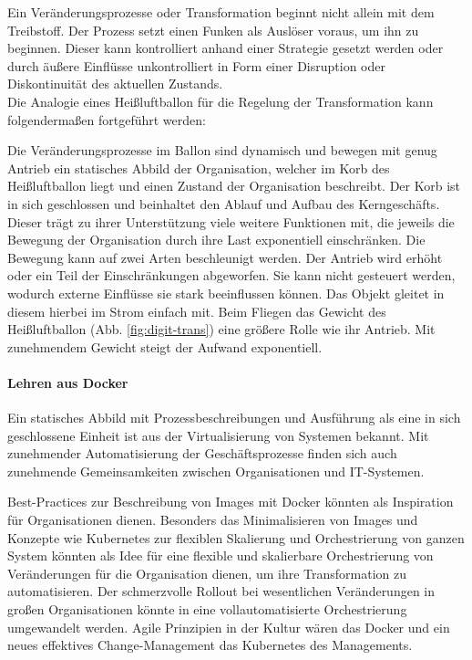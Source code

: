Ein Veränderungsprozesse oder Transformation beginnt nicht allein mit dem Treibstoff. Der Prozess setzt einen Funken als Auslöser voraus, um ihn zu beginnen. Dieser kann kontrolliert anhand einer Strategie gesetzt werden oder durch äußere Einflüsse unkontrolliert in Form einer Disruption oder Diskontinuität \cite{Fernandez:2020} des aktuellen Zustands.
\medskip
\\
Die Analogie eines Heißluftballon für die Regelung der Transformation kann folgendermaßen fortgeführt werden:

Die Veränderungsprozesse im Ballon sind dynamisch und bewegen mit genug Antrieb ein statisches Abbild der Organisation, welcher im Korb des Heißluftballon liegt und einen Zustand der Organisation beschreibt. Der Korb ist in sich geschlossen und beinhaltet den Ablauf und Aufbau des Kerngeschäfts. Dieser trägt zu ihrer Unterstützung viele weitere Funktionen mit, die jeweils die Bewegung der Organisation durch ihre Last exponentiell einschränken. Die Bewegung kann auf zwei Arten beschleunigt werden. Der Antrieb wird erhöht oder ein Teil der Einschränkungen abgeworfen. Sie kann nicht gesteuert werden, wodurch externe Einflüsse sie stark beeinflussen können. Das Objekt gleitet in diesem hierbei im Strom einfach mit. Beim Fliegen das Gewicht des Heißluftballon (Abb. \ref{fig:digit-trans}) eine größere Rolle wie ihr Antrieb. Mit zunehmendem Gewicht steigt der Aufwand exponentiell.
\medskip
\\
\paragraph{Lehren aus Docker}
Ein statisches Abbild mit Prozessbeschreibungen und Ausführung als eine in sich geschlossene Einheit ist aus der Virtualisierung von Systemen bekannt. Mit zunehmender Automatisierung der Geschäftsprozesse finden sich auch zunehmende Gemeinsamkeiten zwischen Organisationen und IT-Systemen. 

Best-Practices zur Beschreibung von Images mit Docker könnten als Inspiration für Organisationen dienen. Besonders das Minimalisieren von Images und Konzepte wie Kubernetes zur flexiblen Skalierung und Orchestrierung von ganzen System könnten als Idee für eine flexible und skalierbare Orchestrierung von Veränderungen für die Organisation dienen, um ihre Transformation zu automatisieren. Der schmerzvolle Rollout bei wesentlichen Veränderungen in großen Organisationen könnte in eine vollautomatisierte Orchestrierung umgewandelt werden.
Agile Prinzipien in der Kultur wären das Docker und ein neues effektives Change-Management das Kubernetes des Managements.

